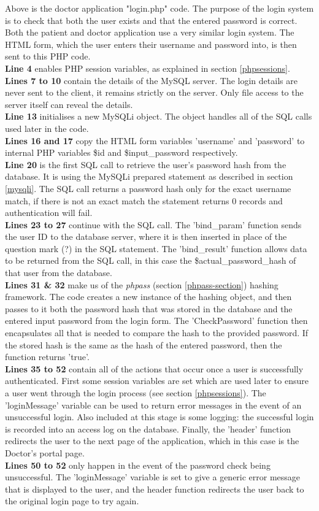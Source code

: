 \documentclass[11pt]{article}
\begin{document}
Above is the doctor application "login.php" code. The purpose of the login system is to check that both the user exists and that the entered password is correct. Both the patient and doctor application use a very similar login system. The HTML form, which the user enters their username and password into, is then sent to this PHP code.
\\
\textbf{Line 4} enables PHP session variables, as explained in section \ref{phpsessions}.
\\
\textbf{Lines 7 to 10} contain the details of the MySQL server. The login details are never sent to the client, it remains strictly on the server. Only file access to the server itself can reveal the details. 
\\
\textbf{Line 13} initialises a new MySQLi object. The object handles all of the SQL calls used later in the code.
\\
\textbf{Lines 16 and 17} copy the HTML form variables 'username' and 'password' to internal PHP variables \$id and \$input\_password respectively.
\\
\textbf{Line 20} is the first SQL call to retrieve the user's password hash from the database. It is using the MySQLi prepared statement as described in section \ref{mysqli}. The SQL call returns a password hash only for the exact username match, if there is not an exact match the statement returns 0 records and authentication will fail.
\\
\textbf{Lines 23 to 27} continue with the SQL call. The 'bind\_param' function sends the user ID to the database server, where it is then inserted in place of the question mark (?) in the SQL statement. The 'bind\_result' function allows data to be returned from the SQL call, in this case the \$actual\_password\_hash of that user from the database. 
\\
\textbf{Lines 31 \& 32} make us of the \textit{phpass} (section \ref{phpass-section}) hashing framework. The code creates a new instance of the hashing object, and then passes to it both the password hash that was stored in the database and the entered input password from the login form. The 'CheckPassword' function then encapsulates all that is needed to compare the hash to the provided password. If the stored hash is the same as the hash of the entered password, then the function returns 'true'.
\\
\textbf{Lines 35 to 52} contain all of the actions that occur once a user is successfully authenticated. First some session variables are set which are used later to ensure a user went through the login process (see section \ref{phpsessions}). The 'loginMessage' variable can be used to return error messages in the event of an unsuccessful login. Also included at this stage is some logging: the successful login is recorded into an access log on the database. Finally, the 'header' function redirects the user to the next page of the application, which in this case is the Doctor's portal page.
\\
\textbf{Lines 50 to 52} only happen in the event of the password check being unsuccessful. The 'loginMessage' variable is set to give a generic error message that is displayed to the user, and the header function redirects the user back to the original login page to try again. 
\end{document}
